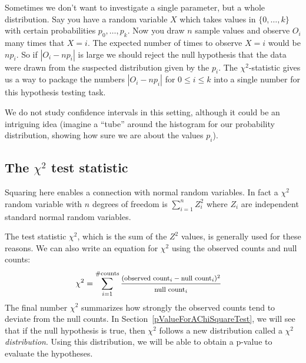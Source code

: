 Sometimes we don't want to investigate a single parameter, but a whole distribution. Say you have a random variable $X$ which takes values in $\{0,\dots,k\}$ with certain probabilities $p_0,\dots,p_k$.
Now you draw $n$ sample values and observe $O_i$ many times that $X=i$. The expected number of times to observe $X=i$ would be $np_i$. So if $|O_i-np_i|$ is large we should reject the null hypothesis that the data were drawn from the suspected distribution given by the $p_i$. The $\chi^2$-statistic gives us a way to package the numbers $|O_i-np_i|$ for $0\le i\le k$ into a single number for this hypothesis testing task.

We do not study confidence intervals in this setting, although it could be an intriguing idea (imagine a ``tube'' around the histogram for our probability distribution, showing how sure we are about the values $p_i$).


\subsection{The $\chi^2$ test statistic}
\label{chiSquareTestStatistic}

Squaring here enables a connection with normal random variables. In fact a $\chi^2$ random variable with $n$ degrees of freedom is $\sum_{i=1}^n Z_i^2$ where $Z_i$ are independent standard normal random variables.

The test statistic $\chi^2$, which is the sum of the $Z^2$ values, is generally used for these reasons. We can also write an equation for $\chi^2$ using the observed counts and null counts:
{\begin{align*}
\chi^2 &= \sum_{i=1}^{\#\text{counts}}
	\frac
	{\text{\footnotesize$(\text{observed count}_i - \text{null count}_i)^2$}}
	{\text{\footnotesize$\text{null count}_i$}}
\end{align*}
}The final number $\chi^2$ summarizes how strongly the observed counts tend to deviate from the null counts. In Section~\ref{pValueForAChiSquareTest}, we will see that if the null hypothesis is true, then $\chi^2$ follows a new distribution called a \emph{$\chi^2$ distribution}. Using this distribution, we will be able to obtain a p-value to evaluate the hypotheses.


